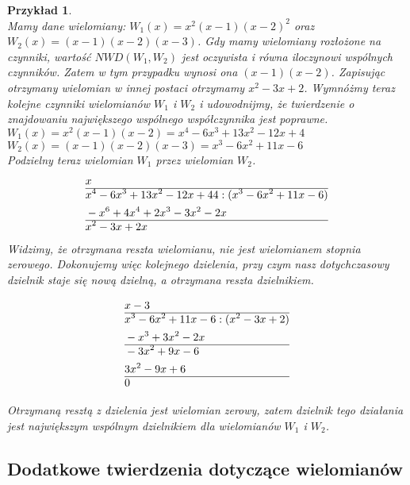 \documentclass[oneside,a4paper]{book}
\newtheorem{example}{Przykład}
\begin{document}
	\begin{example}
		$ $\\
		Mamy dane wielomiany: $W_1(x) = x^2(x-1)(x-2)^2$ oraz $W_2(x) = (x-1)(x-2)(x-3)$. Gdy mamy wielomiany rozłożone na czynniki, wartość $NWD(W_1, W_2)$ jest oczywista i równa iloczynowi wspólnych czynników. Zatem w tym przypadku wynosi ona $(x-1)(x-2)$. Zapisując otrzymany wielomian w innej postaci otrzymamy $x^2-3x+2$. Wymnóżmy teraz kolejne czynniki wielomianów $W_1$ i $W_2$ i udowodnijmy, że twierdzenie o znajdowaniu największego wspólnego współczynnika jest poprawne. \\
		$W_1(x) = x^2(x-1)(x-2) = x^4-6x^3+13x^2-12x+4$ \\
		$W_2(x) = (x-1)(x-2)(x-3) = x^3-6x^2+11x-6$ \\
		Podzielny teraz wielomian $W_1$ przez wielomian $W_2$.
		\begin{equation}
		\begin{split}
		&x\\\hline
		&x^4-6x^3+13x^2-12x+44 : (x^3-6x^2+11x-6) \\
		&-x^6+4x^4+2x^3-3x^2-2x \\\hline
		&x^2-3x+2x \\
		\end{split}
		\end{equation}
		Widzimy, że otrzymana reszta wielomianu, nie jest wielomianem stopnia zerowego. Dokonujemy więc kolejnego dzielenia, przy czym nasz dotychczasowy dzielnik staje się nową dzielną, a otrzymana reszta dzielnikiem.
		
		\begin{equation}
		\begin{split}
		&x-3\\\hline
		&x^3-6x^2+11x-6 : (x^2-3x+2) \\
		&-x^3+3x^2-2x \\\hline
		&-3x^2+9x-6 \\
		&3x^2-9x+6  \\\hline
		&0\\
		\end{split}
		\end{equation}
		
		Otrzymaną resztą z dzielenia jest wielomian zerowy, zatem dzielnik tego działania jest największym wspólnym dzielnikiem dla wielomianów $W_1$ i $W_2$.
	\end{example}
	
	\subsection{Dodatkowe twierdzenia dotyczące wielomianów}
	
\end{document}
